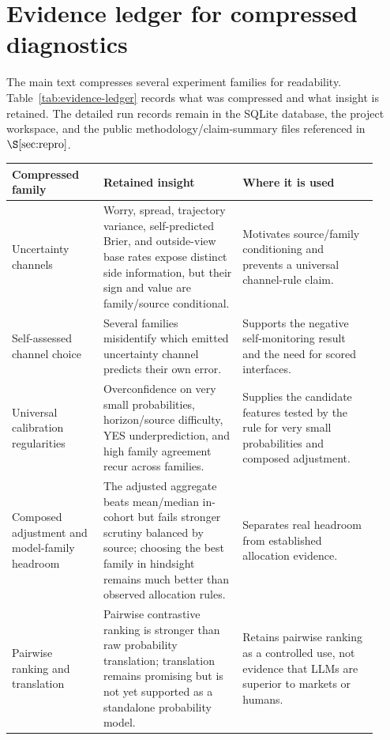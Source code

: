 \documentclass[11pt]{article}
\begin{document}



\appendix

\section{Evidence ledger for compressed diagnostics}
\label{app:evidence-ledger}

The main text compresses several experiment families for readability. Table~\ref{tab:evidence-ledger} records what was compressed and what insight is retained. The detailed run records remain in the SQLite database, the project workspace, and the public methodology/claim-summary files referenced in $\S\ref{sec:repro}$.

\begin{table}[htbp]
\centering
\small
\begin{tabular}{L{0.23\linewidth} L{0.35\linewidth} L{0.34\linewidth}}
\toprule
Compressed family & Retained insight & Where it is used \\
\midrule
Uncertainty channels & Worry, spread, trajectory variance, self-predicted Brier, and outside-view base rates expose distinct side information, but their sign and value are family/source conditional. & Motivates source/family conditioning and prevents a universal channel-rule claim. \\
Self-assessed channel choice & Several families misidentify which emitted uncertainty channel predicts their own error. & Supports the negative self-monitoring result and the need for scored interfaces. \\
Universal calibration regularities & Overconfidence on very small probabilities, horizon/source difficulty, YES underprediction, and high family agreement recur across families. & Supplies the candidate features tested by the rule for very small probabilities and composed adjustment. \\
Composed adjustment and model-family headroom & The adjusted aggregate beats mean/median in-cohort but fails stronger scrutiny balanced by source; choosing the best family in hindsight remains much better than observed allocation rules. & Separates real headroom from established allocation evidence. \\
Pairwise ranking and translation & Pairwise contrastive ranking is stronger than raw probability translation; translation remains promising but is not yet supported as a standalone probability model. & Retains pairwise ranking as a controlled use, not evidence that LLMs are superior to markets or humans. \\

\end{tabular}
\end{table}
\end{document}
